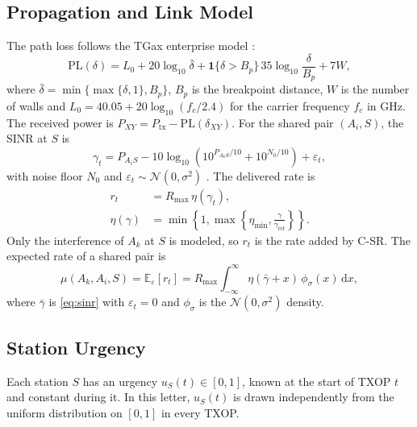 \documentclass[journal]{IEEEtran}
\theoremstyle{definition}
\theoremstyle{remark}
\theoremstyle{plain}
\begin{document}
\subsection{Propagation and Link Model}
The path loss follows the TGax enterprise model \cite{wojnar2025hmab,merlin2015tgax}:
\begin{equation}\label{eq:pathloss}
\mathrm{PL}(\delta)=L_0+20\log_{10}\bar{\delta}+\mathbf{1}\{\delta>B_p\}\,35\log_{10}\frac{\delta}{B_p}+7W,
\end{equation}
where $\bar{\delta}=\min\{\max\{\delta,1\},B_p\}$, $B_p$ is the breakpoint distance, $W$ is the number of walls and $L_0=40.05+20\log_{10}(f_c/2.4)$ for the carrier frequency $f_c$ in GHz. The received power is $P_{XY}=P_{\mathrm{tx}}-\mathrm{PL}(\delta_{XY})$. For the shared pair $(A_i,S)$, the SINR at $S$ is
\begin{equation}\label{eq:sinr}
\gamma_t=P_{A_iS}-10\log_{10}\left(10^{P_{A_kS}/10}+10^{N_0/10}\right)+\varepsilon_t,
\end{equation}
with noise floor $N_0$ and $\varepsilon_t\sim\mathcal{N}(0,\sigma^2)$ \cite{wojnar2025hmab}. The delivered rate is
\begin{align}
r_t&=R_{\max}\,\eta(\gamma_t),\label{eq:rate}\\
\eta(\gamma)&=\min\left\{1,\max\left\{\eta_{\min},\frac{\gamma}{\gamma_{\mathrm{ref}}}\right\}\right\}.\label{eq:eta}
\end{align}
Only the interference of $A_k$ at $S$ is modeled, so $r_t$ is the rate added by C-SR. The expected rate of a shared pair is
\begin{equation}\label{eq:mu}
\mu(A_k,A_i,S)=\mathbb{E}_{\varepsilon}[r_t]=R_{\max}\int_{-\infty}^{\infty}\eta(\bar{\gamma}+x)\,\phi_\sigma(x)\,\mathrm{d}x,
\end{equation}
where $\bar{\gamma}$ is \eqref{eq:sinr} with $\varepsilon_t=0$ and $\phi_\sigma$ is the $\mathcal{N}(0,\sigma^2)$ density.

\subsection{Station Urgency}
Each station $S$ has an urgency $u_S(t)\in[0,1]$, known at the start of TXOP $t$ and constant during it. In this letter, $u_S(t)$ is drawn independently from the uniform distribution on $[0,1]$ in every TXOP.
\end{document}
